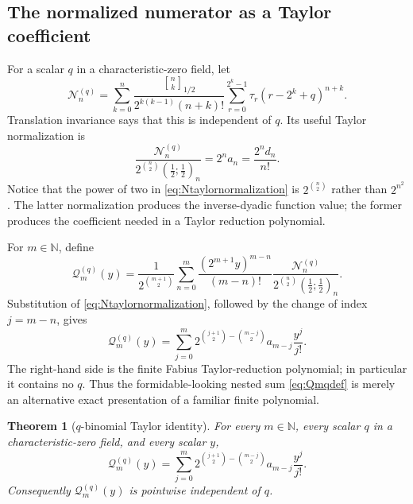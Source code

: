 \documentclass[11pt,oneside]{article}
\newtheorem{theorem}{Theorem}[section]
\theoremstyle{definition}
\theoremstyle{remark}
\newcommand{\qpoch}[3]{\left(#1;#2\right)_{#3}}
\newcommand{\halfqbinom}[2]{{\genfrac{[}{]}{0pt}{}{#1}{#2}}_{1/2}}
\newcommand{\N}{\mathbb N}
\newcommand{\tm}{\tau}
\begin{document}
\subsection{The normalized numerator as a Taylor coefficient}

For a scalar $q$ in a characteristic-zero field, let
\begin{equation}\label{eq:Nnqscalar}
 \mathcal N_n^{(q)}=
 \sum_{k=0}^{n}
 \frac{\halfqbinom{n}{k}}
      {2^{k(k-1)}(n+k)!}
 \sum_{r=0}^{2^k-1}
 \tm_r(r-2^k+q)^{n+k}.
\end{equation}
Translation invariance says that this is independent of $q$.  Its useful
Taylor normalization is
\begin{equation}\label{eq:Ntaylornormalization}
 \boxed{
 \frac{\mathcal N_n^{(q)}}
      {2^{\binom n2}\qpoch{\frac12}{\frac12}{n}}
 =2^na_n=\frac{2^nd_n}{n!}.}
\end{equation}
Notice that the power of two in \eqref{eq:Ntaylornormalization} is
$2^{\binom n2}$ rather than $2^{n^2}$.  The latter normalization produces
the inverse-dyadic function value; the former produces the coefficient
needed in a Taylor reduction polynomial.

For $m\in\N$, define
\begin{equation}\label{eq:Qmqdef}
 \mathcal Q_m^{(q)}(y)=
 \frac1{2^{\binom{m+1}{2}}}
 \sum_{n=0}^{m}
 \frac{(2^{m+1}y)^{m-n}}{(m-n)!}
 \frac{\mathcal N_n^{(q)}}
      {2^{\binom n2}\qpoch{\frac12}{\frac12}{n}}.
\end{equation}
Substitution of \eqref{eq:Ntaylornormalization}, followed by the change of
index $j=m-n$, gives
\begin{equation}\label{eq:QTaylor}
 \mathcal Q_m^{(q)}(y)
 =\sum_{j=0}^{m}
 2^{\binom{j+1}{2}-\binom{m-j}{2}}
 a_{m-j}\frac{y^j}{j!}.
\end{equation}
The right-hand side is the finite Fabius Taylor-reduction polynomial; in
particular it contains no $q$.  Thus the formidable-looking nested sum
\eqref{eq:Qmqdef} is merely an alternative exact presentation of a familiar
finite polynomial.

\begin{theorem}[$q$-binomial Taylor identity]\label{thm:qTaylor}
For every $m\in\N$, every scalar $q$ in a characteristic-zero field, and
every scalar $y$,
\begin{equation}\label{eq:qTayloridentity}
 \boxed{\mathcal Q_m^{(q)}(y)=
 \sum_{j=0}^{m}
 2^{\binom{j+1}{2}-\binom{m-j}{2}}
 a_{m-j}\frac{y^j}{j!}.}
\end{equation}
Consequently $\mathcal Q_m^{(q)}(y)$ is pointwise independent of $q$.
\end{theorem}
\end{document}

